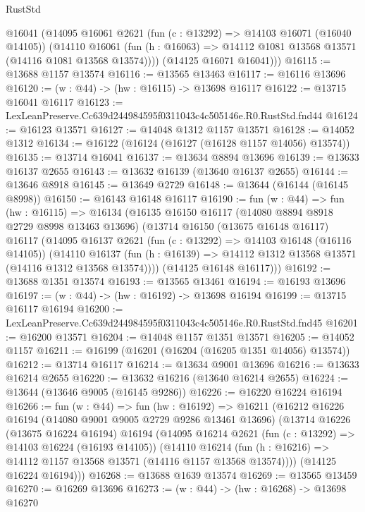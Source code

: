 \begin{lexlean}{RustStd}
\begin{coremodule}
        @16041
        (@14095
          @16061
          @2621
          (fun (c : @13292) => @14103 @16071 (@16040 @14105))
          (@14110
            @16061
            (fun (h : @16063) => @14112 @1081 @13568 @13571 (@14116 @1081 @13568 @13574))))
        (@14125 @16071 @16041)))
@16115 := @13688 @1157 @13574
@16116 := @13565 @13463
@16117 := @16116 @13696
@16120 := (w : @44) -> (hw : @16115) -> @13698 @16117
@16122 := @13715 @16041 @16117
@16123 := LexLeanPreserve.Cc639d244984595f0311043c4c505146e.R0.RustStd.fnd44
@16124 := @16123 @13571
@16127 := @14048 @1312 @1157 @13571
@16128 := @14052 @1312
@16134 := @16122 (@16124 (@16127 (@16128 @1157 @14056) @13574))
@16135 := @13714 @16041
@16137 := @13634 @8894 @13696
@16139 := @13633 @16137 @2655
@16143 := @13632 @16139 (@13640 @16137 @2655)
@16144 := @13646 @8918
@16145 := @13649 @2729
@16148 := @13644 (@16144 (@16145 @8998))
@16150 := @16143 @16148 @16117
@16190 := fun (w : @44) =>
  fun (hw : @16115) =>
  @16134
    (@16135
      @16150
      @16117
      (@14080 @8894 @8918 @2729 @8998 @13463 @13696)
      (@13714
        @16150
        (@13675 @16148 @16117)
        @16117
        (@14095
          @16137
          @2621
          (fun (c : @13292) => @14103 @16148 (@16116 @14105))
          (@14110
            @16137
            (fun (h : @16139) => @14112 @1312 @13568 @13571 (@14116 @1312 @13568 @13574))))
        (@14125 @16148 @16117)))
@16192 := @13688 @1351 @13574
@16193 := @13565 @13461
@16194 := @16193 @13696
@16197 := (w : @44) -> (hw : @16192) -> @13698 @16194
@16199 := @13715 @16117 @16194
@16200 := LexLeanPreserve.Cc639d244984595f0311043c4c505146e.R0.RustStd.fnd45
@16201 := @16200 @13571
@16204 := @14048 @1157 @1351 @13571
@16205 := @14052 @1157
@16211 := @16199 (@16201 (@16204 (@16205 @1351 @14056) @13574))
@16212 := @13714 @16117
@16214 := @13634 @9001 @13696
@16216 := @13633 @16214 @2655
@16220 := @13632 @16216 (@13640 @16214 @2655)
@16224 := @13644 (@13646 @9005 (@16145 @9286))
@16226 := @16220 @16224 @16194
@16266 := fun (w : @44) =>
  fun (hw : @16192) =>
  @16211
    (@16212
      @16226
      @16194
      (@14080 @9001 @9005 @2729 @9286 @13461 @13696)
      (@13714
        @16226
        (@13675 @16224 @16194)
        @16194
        (@14095
          @16214
          @2621
          (fun (c : @13292) => @14103 @16224 (@16193 @14105))
          (@14110
            @16214
            (fun (h : @16216) => @14112 @1157 @13568 @13571 (@14116 @1157 @13568 @13574))))
        (@14125 @16224 @16194)))
@16268 := @13688 @1639 @13574
@16269 := @13565 @13459
@16270 := @16269 @13696
@16273 := (w : @44) -> (hw : @16268) -> @13698 @16270

\end{coremodule}
\end{lexlean}
